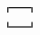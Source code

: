 \begin{table}[t!]
\begin{small}
$$
\delimite{
\begin{array}{c}
%

\end{array}}$$
\end{small}
\end{table}
